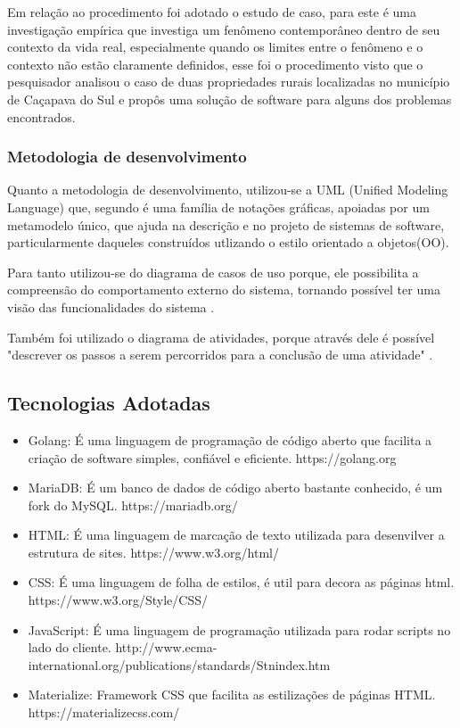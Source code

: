 \documentclass[12pt]{article}
\begin{document}
Em relação ao procedimento foi adotado o estudo de caso, para  este é uma investigação empírica que investiga um fenômeno contemporâneo dentro de seu contexto da vida real, especialmente quando os limites entre o fenômeno e o contexto não estão claramente definidos, esse foi o procedimento visto que o pesquisador analisou o caso de duas propriedades rurais localizadas no município de Caçapava do Sul e propôs uma solução de software para alguns dos problemas encontrados.

\subsubsection{Metodologia de desenvolvimento}

Quanto a metodologia de desenvolvimento, utilizou-se a UML (Unified Modeling Language) que, segundo  é uma família de notações gráficas, apoiadas por um metamodelo único, que ajuda na descrição e no projeto de sistemas de software, particularmente daqueles construídos utlizando o estilo orientado a objetos(OO).

Para tanto utilizou-se do diagrama de casos de uso porque, ele possibilita a compreensão do comportamento externo do sistema, tornando possível ter uma visão das funcionalidades do sistema \cite{guedes18}.

Também foi utilizado o diagrama de atividades, porque através dele é possível "descrever os passos a serem percorridos para a conclusão de uma atividade" \cite{guedes18}.

\subsection{Tecnologias Adotadas}

\begin{itemize}
	\item Golang: É uma linguagem de programação de código aberto que facilita a criação de software simples, confiável e eficiente. https://golang.org	
	\item MariaDB: É um banco de dados de código aberto bastante conhecido, é um fork do MySQL. https://mariadb.org/
	\item HTML: É uma linguagem de marcação de texto utilizada para desenvilver a estrutura de sites. https://www.w3.org/html/
	\item CSS: É uma linguagem de folha de estilos, é util para decora as páginas html. https://www.w3.org/Style/CSS/
	\item JavaScript: É uma linguagem de programação utilizada para rodar scripts no lado do cliente. http://www.ecma-international.org/publications/standards/Stnindex.htm
	\item Materialize: Framework CSS que facilita as estilizações de páginas HTML. https://materializecss.com/
\end{itemize}
\end{document}
